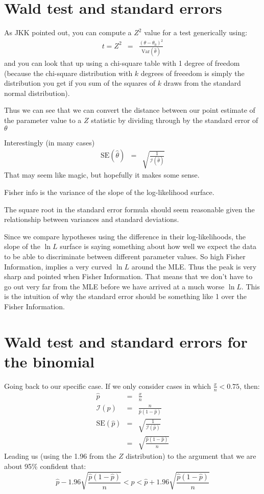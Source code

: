 \documentclass[11pt]{article}
\begin{document}
\section*{Wald test and standard errors}
As JKK pointed out, you can compute a $Z^2$ value  for a test generically using:
\begin{eqnarray}
t = Z^2 & = & \frac{\left(\theta-\theta_0\right)^2}{\mbox{Var}(\hat{\theta})}
\end{eqnarray}
and you can look that up using a chi-square table with 1 degree of freedom (because the chi-square
distribution with $k$ degrees of freeedom is simply the distribution you get
if you sum of the squares of $k$ draws from the standard normal distribution).

Thus we can see that we can convert the distance between our point estimate of the parameter
    value to a $Z$ statistic by dividing through by the standard error
    of $\theta$

Interestingly (in many cases)
\begin{eqnarray}
\mbox{SE}(\hat{\theta}) & = & \sqrt{\frac{1}{ \mathcal{I}(\hat{\theta})}}
\end{eqnarray}
That may seem like magic, but hopefully it makes some sense.

Fisher info is the variance of the slope of the log-likelihood surface. 

The square root in the standard error formula should seem reasonable given the 
    relationship between variances and standard deviations.

Since we compare hypotheses using the difference in their log-likelihoods, the
    slope of the $\ln L$ surface is saying something about how well we 
    expect the data to be able to discriminate between different parameter values.
So high Fisher Information, implies a very curved $\ln L$ around the MLE.
Thus the peak is very sharp and pointed when Fisher Information.
That means that we don't have to go out very far from the MLE before we have 
    arrived at a much worse $\ln L$.
This is the intuition of why the standard error should be something like 1 over the Fisher Information.

\section*{Wald test and standard errors for the binomial}
Going back to our specific case.
If we only consider cases in which $\frac{x}{n} < 0.75$, then:
\begin{eqnarray}
\hat{p} & = & \frac{x}{n} \\
\mathcal{I}(\hat{p}) & = & \frac{n}{\hat{p}(1-\hat{p})} \\
\mbox{SE}(\hat{p}) & = & \sqrt{\frac{1}{ \mathcal{I}(\hat{p})}} \\
& = & \sqrt{\frac{\hat{p}(1-\hat{p})}{n}}
\end{eqnarray}
Leading us (using the 1.96 from the $Z$ distribution) to the argument that we are about
95\% confident that:
\[
\hat{p} - 1.96\sqrt{\frac{\hat{p}(1-\hat{p})}{n}} < p < \hat{p} + 1.96\sqrt{\frac{\hat{p}(1-\hat{p})}{n}} 
\]
\end{document}
